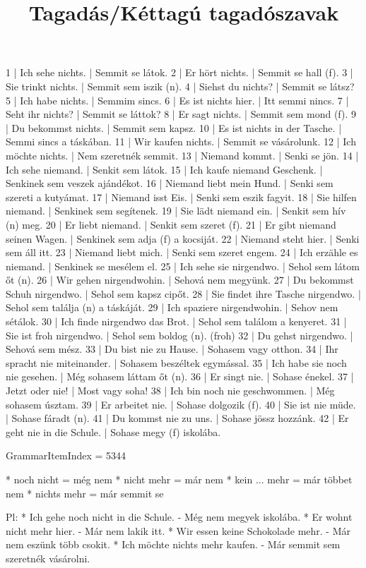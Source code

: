\begin{exmp}
1 | Ich sehe nichts. | Semmit se látok.
2 | Er hört nichts. | Semmit se hall (f).
3 | Sie trinkt nichts. | Semmit sem iszik (n).
4 | Siehst du nichts? | Semmit se látsz?
5 | Ich habe nichts. | Semmim sincs.
6 | Es ist nichts hier. | Itt semmi nincs.
7 | Seht ihr nichts? | Semmit se láttok?
8 | Er sagt nichts. | Semmit sem mond (f).
9 | Du bekommst nichts. | Semmit sem kapsz.
10 | Es ist nichts in der Tasche. | Semmi sincs a táskában.
11 | Wir kaufen nichts. | Semmit se vásárolunk.
12 | Ich möchte nichts. | Nem szeretnék semmit.
13 | Niemand kommt. | Senki se jön.
14 | Ich sehe niemand. | Senkit sem látok.
15 | Ich kaufe niemand Geschenk. | Senkinek sem veszek ajándékot.
16 | Niemand liebt mein Hund. | Senki sem szereti a kutyámat.
17 | Niemand isst Eis. | Senki sem eszik fagyit.
18 | Sie hilfen niemand. | Senkinek sem segítenek.
19 | Sie lädt niemand ein. | Senkit sem hív (n) meg.
20 | Er liebt niemand. | Senkit sem szeret (f).
21 | Er gibt niemand seinen Wagen. | Senkinek sem adja (f) a kocsiját.
22 | Niemand steht hier. | Senki sem áll itt.
23 | Niemand liebt mich. | Senki sem szeret engem.
24 | Ich erzähle es niemand. | Senkinek se mesélem el.
25 | Ich sehe sie nirgendwo. | Sehol sem látom őt (n).
26 | Wir gehen nirgendwohin. | Sehová nem megyünk.
27 | Du bekommst Schuh nirgendwo. | Sehol sem kapsz cipőt.
28 | Sie findet ihre Tasche nirgendwo. | Sehol sem találja (n) a táskáját.
29 | Ich spaziere nirgendwohin. | Sehov nem sétálok.
30 | Ich finde nirgendwo das Brot. | Sehol sem találom a kenyeret.
31 | Sie ist froh nirgendwo. | Sehol sem boldog (n). (froh)
32 | Du gehst nirgendwo. | Sehová sem mész.
33 | Du bist nie zu Hause. | Sohasem vagy otthon.
34 | Ihr spracht nie miteinander. | Sohasem beszéltek egymással.
35 | Ich habe sie noch nie gesehen. | Még sohasem láttam őt (n).
36 | Er singt nie. | Sohase énekel.
37 | Jetzt oder nie! | Most vagy soha!
38 | Ich bin noch nie geschwommen. | Még sohasem úsztam.
39 | Er arbeitet nie. | Sohase dolgozik (f).
40 | Sie ist nie müde. | Sohase fáradt (n).
41 | Du kommst nie zu uns. | Sohase jössz hozzánk.
42 | Er geht nie in die Schule. | Sohase megy (f) iskolába.
\end{exmp}

\title{Tagadás/Kéttagú tagadószavak}

GrammarItemIndex = 5344

\begin{desc}
* noch nicht = még nem
* nicht mehr = már nem
* kein ... mehr = már többet nem
* nichts mehr = már semmit se

Pl: * Ich gehe noch nicht in die Schule. - Még nem megyek iskolába.
* Er wohnt nicht mehr hier. - Már nem lakik itt.
* Wir essen keine Schokolade mehr. - Már nem eszünk több csokit.
* Ich möchte nichts mehr kaufen. - Már semmit sem szeretnék vásárolni.
\end{desc}

